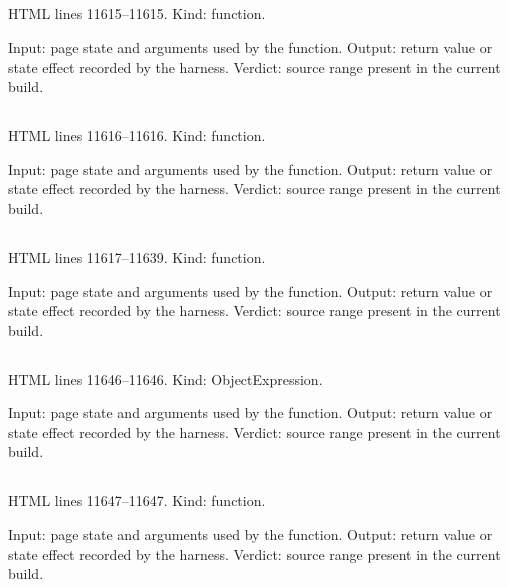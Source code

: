 \subsection*{\texttt{}}
\label{vf_647_cmdClose}
HTML lines 11615--11615. Kind: function.

Input: page state and arguments used by the function.
Output: return value or state effect recorded by the harness.
Verdict: source range present in the current build.

\subsection*{\texttt{}}
\label{vf_648_cmdToggle}
HTML lines 11616--11616. Kind: function.

Input: page state and arguments used by the function.
Output: return value or state effect recorded by the harness.
Verdict: source range present in the current build.

\subsection*{\texttt{}}
\label{vf_649_cmdInit}
HTML lines 11617--11639. Kind: function.

Input: page state and arguments used by the function.
Output: return value or state effect recorded by the harness.
Verdict: source range present in the current build.

\subsection*{\texttt{}}
\label{vf_650_AST}
HTML lines 11646--11646. Kind: ObjectExpression.

Input: page state and arguments used by the function.
Output: return value or state effect recorded by the harness.
Verdict: source range present in the current build.

\subsection*{\texttt{}}
\label{vf_651_astEl}
HTML lines 11647--11647. Kind: function.

Input: page state and arguments used by the function.
Output: return value or state effect recorded by the harness.
Verdict: source range present in the current build.

